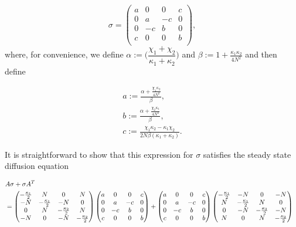 \documentclass[11pt,a4paper]{article}
\numberwithin{equation}{section}
\begin{document}
	\begin{equation} \label{eq:44}
	\sigma = \begin{pmatrix}
	a & 0 & 0 & c\\
	0 & a & -c & 0\\
	0 & -c & b & 0 \\
	c & 0 & 0 & b\\
	\end{pmatrix},
	\end{equation}	
	where, for convenience, we define $\alpha := \Big(\dfrac{\chi_1 + \chi_2}{\kappa_1 + \kappa_2}\Big)$ and $\beta := 1 + \frac{\kappa_1 \kappa_2}{4N^2}$ and then define
	
	
	\begin{align*}
	&a := \frac{\alpha + \frac{\chi_1 \kappa_2}{4N^2}}{\beta},&\\
	&b := \frac{\alpha + \frac{\chi_2 \kappa_1}{4N^2}}{\beta},&\\
	&c := \frac{\chi_1 \kappa_2 - \kappa_1 \chi_2}{2N\beta (\kappa_1+\kappa_2)}.&		
	\end{align*}


	It is straightforward to show that this expression for $\sigma$ satisfies the steady state diffusion equation

	\begin{align*}
	\setlength\arraycolsep{3pt}
	&A\sigma +\sigma A^{T}&\\
	&= \begin{pmatrix}
	-\frac{\kappa_1}{2} & N & 0 & N\\
	-N & -\frac{\kappa_1}{2} & -N & 0 \\
	0 & N & -\frac{\kappa_2}{2} & N\\
	-N & 0 & -N & -\frac{\kappa_2}{2}\\
	\end{pmatrix}\begin{pmatrix}
	a & 0 & 0 & c\\
	0 & a & -c & 0\\
	0 & -c & b & 0 \\
	c & 0 & 0 & b\\
	\end{pmatrix} + \begin{pmatrix}
	a & 0 & 0 & c\\
	0 & a & -c & 0\\
	0 & -c & b & 0 \\
	c & 0 & 0 & b\\
	\end{pmatrix}\begin{pmatrix}
	-\frac{\kappa_1}{2} & -N & 0 & -N\\
	N & -\frac{\kappa_1}{2} & N & 0 \\
	0 & -N & -\frac{\kappa_2}{2} & -N\\
	N & 0 & N & -\frac{\kappa_2}{2}\\
	\end{pmatrix}
	\end{align*}
	
\end{document}
